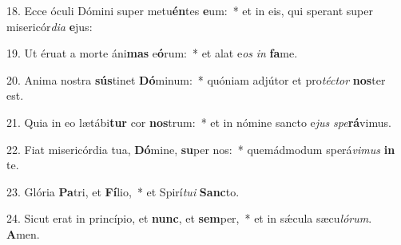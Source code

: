 18. Ecce óculi Dómini super metu\textbf{én}tes \textbf{e}um:~*  et in eis, qui sperant super misericór\textit{di}\textit{a} \textbf{e}jus:\

19. Ut éruat a morte áni\textbf{mas} e\textbf{ó}rum:~*  et alat e\textit{os} \textit{in} \textbf{fa}me.\

20. Anima nostra \textbf{sús}tinet \textbf{Dó}minum:~*  quóniam adjútor et pro\textit{téc}\textit{tor} \textbf{nos}ter est.\

21. Quia in eo lætábi\textbf{tur} cor \textbf{nos}trum:~*  et in nómine sancto e\textit{jus} \textit{spe}\textbf{rá}vimus.\

22. Fiat misericórdia tua, \textbf{Dó}mine, \textbf{su}per nos:~*  quemádmodum sperá\textit{vi}\textit{mus} \textbf{in} te.\

23. Glória \textbf{Pa}tri, et \textbf{Fí}lio,~*  et Spirí\textit{tu}\textit{i} \textbf{Sanc}to.\

24. Sicut erat in princípio, et \textbf{nunc}, et \textbf{sem}per,~*  et in sǽcula sæcu\textit{ló}\textit{rum}. \textbf{A}men.\

